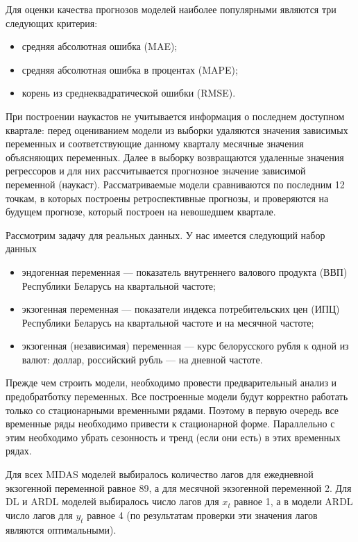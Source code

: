 \documentclass[a4paper, 12pt]{extarticle}
\begin{document}
	Для оценки качества прогнозов моделей наиболее популярными являются три следующих критерия: 
	\begin{itemize}
		\item средняя абсолютная ошибка (MAE);
		\item средняя абсолютная ошибка в процентах (MAPE);
		\item корень из среднеквадратической ошибки (RMSE).
	\end{itemize}
	При построении наукастов не учитывается информация о последнем доступном квартале: перед оцениванием модели из выборки удаляются значения зависимых переменных и соответствующие данному кварталу месячные значения объясняющих переменных. Далее в выборку возвращаются удаленные значения регрессоров и для них рассчитывается прогнозное значение зависимой переменной (наукаст). Рассматриваемые модели сравниваются по последним 12 точкам, в которых построены ретроспективные прогнозы, и проверяются на будущем прогнозе, который построен на невошедшем квартале.
	
	Рассмотрим задачу для реальных данных. У нас имеется следующий набор данных
	\begin{itemize}
		\item эндогенная переменная --- показатель внутреннего валового продукта (ВВП) Республики Беларусь на квартальной частоте;
		\item экзогенная переменная --- показатели индекса потребительских цен (ИПЦ) Республики Беларусь на квартальной частоте и на месячной частоте;
		\item экзогенная (независимая) переменная --- курс белорусского рубля к одной из валют: доллар, российский рубль --- на дневной частоте.
	\end{itemize}
	Прежде чем строить модели, необходимо провести предварительный анализ и предобратботку переменных. Все построенные модели будут корректно работать только со стационарными временными рядами. Поэтому в первую очередь все временные ряды необходимо привести к стационарной форме. Параллельно с этим необходимо убрать сезонность и тренд (если они есть) в этих временных рядах.
	
	Для всех MIDAS моделей выбиралось количество лагов для ежедневной экзогенной переменной равное 89, а для месячной экзогенной переменной 2. Для DL и ARDL моделей выбиралось число лагов для $x_t$ равное 1, а в модели ARDL число лагов для $y_t$ равное 4 (по результатам проверки эти значения лагов являются оптимальными). 
	
\end{document}
